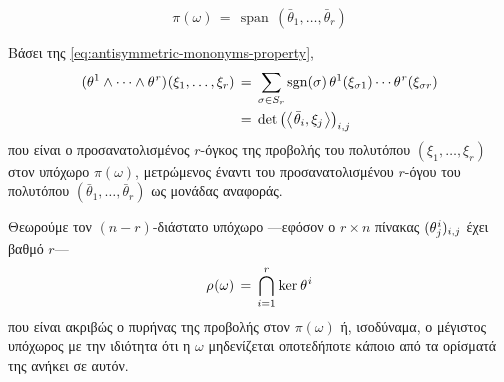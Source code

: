 \documentclass[11pt,a4paper,twoside,openright]{book}
\begin{document}
\begin{equation}
\pi(\omega)
\,=\,
\operatorname{span}\,(\bar{\theta}_1, \dots, \bar{\theta}_r)
\end{equation}

Βάσει της \eqref{eq:antisymmetric-mononyms-property},
\begin{equation}\label{eq:covariant-mononym-evaluation}
\begin{split}
(\theta^1 \wedge \dots \wedge \theta^{\hspace{.5pt}r})\hspace{.5pt}(\xi_1, \dots, \xi_r)
\,&=\,
\sum_{\sigma \in S_r}
\operatorname{sgn}(\sigma)
\,
\theta^1(\xi_{\sigma 1}) \cdots \theta^{\hspace{.5pt}r}(\xi_{\sigma r})\\
\,&=\,
\det \left(
\left \langle\hspace{.75pt}\bar{\theta}_i,\xi_j\hspace{.75pt}\right \rangle
\right)_{i,j}
\end{split}
\end{equation}
που είναι ο προσανατολισμένος $r$-όγκος της προβολής του
πολυτόπου $(\xi_1, \dots, \xi_r)$
στον υπόχωρο $\pi(\omega)$, μετρώμενος έναντι του προσανατολισμένου $r$-όγου του πολυτόπου $(\bar{\theta}_1, \dots, \bar{\theta}_r)$ ως μονάδας αναφοράς.

Θεωρούμε τον $(n-r)$-διάστατο υπόχωρο
---εφόσον ο $r \times n$ πίνακας $(\theta^{\hspace{.5pt}i}_j)_{i,j}$
έχει βαθμό $r$---
\begin{equation}
\rho\hspace{.5pt}(\omega)
\,=\,
\bigcap_{i=1}^r
\hspace{.5pt}\operatorname{ker}\hspace{.5pt}\theta^{\hspace{.5pt}i}
\end{equation}
\noindent
που είναι ακριβώς ο πυρήνας της προβολής στον $\pi(\omega)$
ή, ισοδύναμα, ο μέγιστος υπόχωρος με την ιδιότητα ότι η $\omega$ μηδενίζεται οποτεδήποτε κάποιο από τα ορίσματά της ανήκει σε αυτόν.
\end{document}
